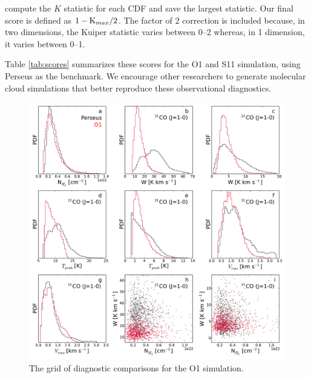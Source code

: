 {compute the $K$ statistic for each CDF and save the largest statistic. Our final score is defined as $1 - {\rm K}_{max} / 2$. The factor of 2 correction is included because, in  two dimensions, the Kuiper statistic varies between 0--2 whereas, in 1 dimension, it varies between 0--1.

Table \ref{tab:scores} summarizes these scores for the O1 and S11 simulation, using Perseus as the benchmark. We encourage other researchers to generate molecular cloud simulations that better reproduce these observational diagnostics.



\begin{figure}
\includegraphics[width=6in]{figures/diagnostic_O1}
\caption{The grid of diagnostic comparisons for the O1 simulation.}
\label{fig:dgrid_stella}
\end{figure}

}
